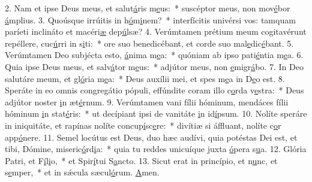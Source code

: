 2. Nam et ipse Deus meus, et salut\uline{á}ris m\uline{e}us:~* suscéptor meus, non mov\uline{é}bor \uline{á}mplius.
3. Quoúsque irrúitis in h\uline{ó}m\uline{i}nem?~* interfícitis univérsi vos: tamquam paríeti inclináto et macéri\uline{æ} dep\uline{ú}lsæ?
4. Verúmtamen prétium meum cogitavérunt repéllere, cuc\uline{ú}rri in s\uline{i}ti:~* ore suo benedicébant, et corde suo mal\uline{e}dic\uline{é}bant.
5. Verúmtamen Deo subjécta esto, \uline{á}nima m\uline{e}a:~* quóniam ab ipso pati\uline{é}ntia m\uline{e}a.
6. Quia ipse Deus meus, et salv\uline{á}tor m\uline{e}us:~* adjútor meus, non \uline{e}migr\uline{á}bo.
7. In Deo salutáre meum, et gl\uline{ó}ria m\uline{e}a:~* Deus auxílii mei, et spes m\uline{e}a in D\uline{e}o est.
8. Speráte in eo omnis congregátio pópuli, effúndite coram illo c\uline{o}rda v\uline{e}stra:~* Deus adjútor noster \uline{i}n æt\uline{é}rnum.
9. Verúmtamen vani fílii hóminum, mendáces fílii hóminum \uline{i}n stat\uline{é}ris:~* ut decípiant ipsi de vanitáte \uline{i}n id\uline{í}psum.
10. Nolíte speráre in iniquitáte, et rapínas nolíte concup\uline{í}sc\uline{e}re:~* divítiæ si áffluant, nolíte c\uline{o}r app\uline{ó}nere.
11. Semel locútus est Deus, duo hæc audívi, quia potéstas Dei est, et tibi, Dómine, miseric\uline{ó}rd\uline{i}a:~* quia tu reddes unicuíque juxta \uline{ó}pera s\uline{u}a.
12. Glória Patri, et F\uline{í}l\uline{i}o,~* et Spir\uline{í}tui S\uline{a}ncto.
13. Sicut erat in princípio, et n\uline{u}nc, et s\uline{e}mper,~* et in sǽcula sæcul\uline{ó}rum. \uline{A}men.
